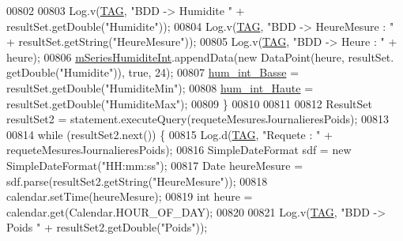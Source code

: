 \begin{DoxyCode}
00802 
00803                             Log.v(\hyperlink{classfr_1_1campus_1_1laurainc_1_1honeybee_1_1_ruche_a44739cbb0fa7451c1edc240a3f51c257}{TAG}, \textcolor{stringliteral}{"BDD -> Humidite "} + resultSet.getDouble(\textcolor{stringliteral}{"Humidite"}));
00804                             Log.v(\hyperlink{classfr_1_1campus_1_1laurainc_1_1honeybee_1_1_ruche_a44739cbb0fa7451c1edc240a3f51c257}{TAG}, \textcolor{stringliteral}{"BDD -> HeureMesure : "} + resultSet.getString(\textcolor{stringliteral}{"HeureMesure"}));
00805                             Log.v(\hyperlink{classfr_1_1campus_1_1laurainc_1_1honeybee_1_1_ruche_a44739cbb0fa7451c1edc240a3f51c257}{TAG}, \textcolor{stringliteral}{"BDD -> Heure : "} + heure);
00806                             \hyperlink{classfr_1_1campus_1_1laurainc_1_1honeybee_1_1_ruche_af36001cde96599deef784d3be498ae65}{mSeriesHumiditeInt}.appendData(\textcolor{keyword}{new} DataPoint(heure, resultSet.
      getDouble(\textcolor{stringliteral}{"Humidite"})), \textcolor{keyword}{true}, 24);
00807                             \hyperlink{classfr_1_1campus_1_1laurainc_1_1honeybee_1_1_ruche_a5d7949f1f6daa28454a0a5468faab337}{hum\_int\_Basse} = resultSet.getDouble(\textcolor{stringliteral}{"HumiditeMin"});
00808                             \hyperlink{classfr_1_1campus_1_1laurainc_1_1honeybee_1_1_ruche_ac6b4da59e8ad8537926cc4ca7a6d4746}{hum\_int\_Haute} = resultSet.getDouble(\textcolor{stringliteral}{"HumiditeMax"});
00809                         \}
00810 
00811 
00812                         ResultSet resultSet2 = statement.executeQuery(requeteMesuresJournalieresPoids);
00813 
00814                         \textcolor{keywordflow}{while} (resultSet2.next()) \{
00815                             Log.d(\hyperlink{classfr_1_1campus_1_1laurainc_1_1honeybee_1_1_ruche_a44739cbb0fa7451c1edc240a3f51c257}{TAG}, \textcolor{stringliteral}{"Requete : "} + requeteMesuresJournalieresPoids);
00816                             SimpleDateFormat sdf = \textcolor{keyword}{new} SimpleDateFormat(\textcolor{stringliteral}{"HH:mm:ss"});
00817                             Date heureMesure = sdf.parse(resultSet2.getString(\textcolor{stringliteral}{"HeureMesure"}));
00818                             calendar.setTime(heureMesure);
00819                             \textcolor{keywordtype}{int} heure = calendar.get(Calendar.HOUR\_OF\_DAY);
00820 
00821                             Log.v(\hyperlink{classfr_1_1campus_1_1laurainc_1_1honeybee_1_1_ruche_a44739cbb0fa7451c1edc240a3f51c257}{TAG}, \textcolor{stringliteral}{"BDD -> Poids "} + resultSet2.getDouble(\textcolor{stringliteral}{"Poids"}));

\end{DoxyCode}
